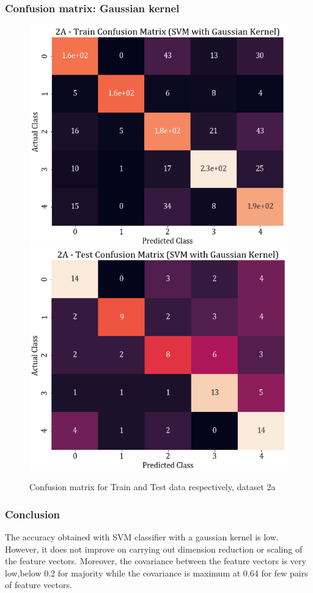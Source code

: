 \documentclass[11pt,a4paper]{article}
\begin{document}
\subsubsection{Confusion matrix: Gaussian kernel}

\begin{figure}[H]
    \centering
    \includegraphics[scale=0.4]{images/2A_SVM_gauss_train_confmat.png}
    \includegraphics[scale=0.4]{images/2A_SVM_gauss_Test_confmat.png}
    \caption{Confusion matrix for Train and Test data respectively, dataset 2a}
\end{figure}

\subsubsection{Conclusion}
The accuracy obtained with SVM classifier with a gaussian kernel is low. However, it does not improve on carrying out dimension reduction or scaling of the feature vectors. Moreover, the covariance between the feature vectors is very low,below 0.2 for majority while the covariance is maximum at 0.64 for few pairs of feature vectors. 
\end{document}
